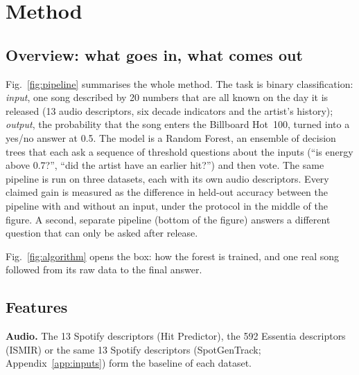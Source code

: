 \documentclass[conference]{IEEEtran}
\begin{document}
\section{Method}



\subsection{Overview: what goes in, what comes out}
Fig.~\ref{fig:pipeline} summarises the whole method. The task is binary classification: \emph{input}, one
song described by 20 numbers that are all known on the day it is released (13 audio descriptors, six decade
indicators and the artist's history); \emph{output}, the probability that the song enters the Billboard
Hot~100, turned into a yes/no answer at 0.5. The model is a Random Forest, an ensemble of decision trees that
each ask a sequence of threshold questions about the inputs (``is energy above 0.7?'', ``did the artist
have an earlier hit?'') and then vote. The same pipeline is run on three datasets, each with its own audio
descriptors. Every claimed gain is measured as the difference in held-out accuracy between the pipeline with
and without an input, under the protocol in the middle of the figure. A second, separate pipeline (bottom of the
figure) answers a different question that can only be asked after release.

Fig.~\ref{fig:algorithm} opens the box: how the forest is trained, and one real song followed from its raw data to
the final answer.




\subsection{Features}\label{sec:features}
\textbf{Audio.} The 13 Spotify descriptors (Hit Predictor), the 592 Essentia descriptors
(ISMIR) or the same 13 Spotify descriptors (SpotGenTrack; Appendix~\ref{app:inputs}) form the baseline of each dataset.
\end{document}
